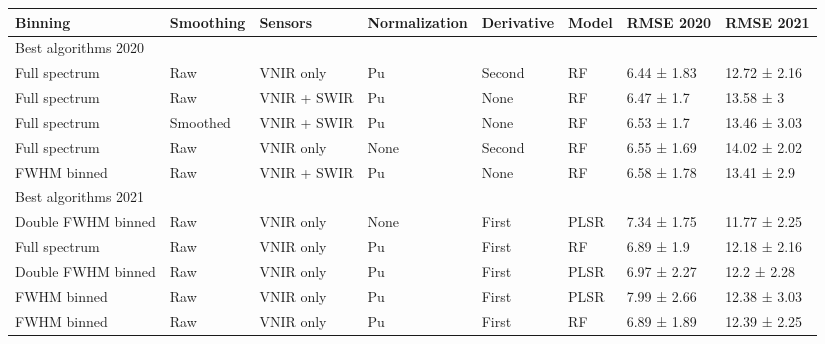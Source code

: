 \captionsetup[table]{labelformat=empty,skip=1pt}
\begin{longtable}{llllllll}
\toprule
Binning & Smoothing & Sensors & Normalization & Derivative & Model & RMSE 2020 & RMSE 2021 \\ 
\midrule
\multicolumn{1}{l}{Best algorithms 2020} \\ 
\midrule
Full spectrum & Raw & VNIR only & Pu & Second & RF & 6.44 ± 1.83 & 12.72 ± 2.16 \\ 
Full spectrum & Raw & VNIR + SWIR & Pu & None & RF & 6.47 ± 1.7 & 13.58 ± 3 \\ 
Full spectrum & Smoothed & VNIR + SWIR & Pu & None & RF & 6.53 ± 1.7 & 13.46 ± 3.03 \\ 
Full spectrum & Raw & VNIR only & None & Second & RF & 6.55 ± 1.69 & 14.02 ± 2.02 \\ 
FWHM binned & Raw & VNIR + SWIR & Pu & None & RF & 6.58 ± 1.78 & 13.41 ± 2.9 \\ 
\midrule
\multicolumn{1}{l}{Best algorithms 2021} \\ 
\midrule
Double FWHM binned & Raw & VNIR only & None & First & PLSR & 7.34 ± 1.75 & 11.77 ± 2.25 \\ 
Full spectrum & Raw & VNIR only & Pu & First & RF & 6.89 ± 1.9 & 12.18 ± 2.16 \\ 
Double FWHM binned & Raw & VNIR only & Pu & First & PLSR & 6.97 ± 2.27 & 12.2 ± 2.28 \\ 
FWHM binned & Raw & VNIR only & Pu & First & PLSR & 7.99 ± 2.66 & 12.38 ± 3.03 \\ 
FWHM binned & Raw & VNIR only & Pu & First & RF & 6.89 ± 1.89 & 12.39 ± 2.25 \\ 
\bottomrule
\end{longtable}

